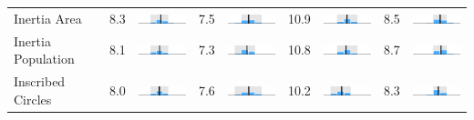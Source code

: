 \begin{table}
\begin{tabular}{l rm{7em} rm{7em} rm{7em} rm{7em}}
Inertia Area           &   8.3 &    \includegraphics[width=7em]{mini_hist/PA_2000_inertia_a} &   7.5 &    \includegraphics[width=7em]{mini_hist/PA_2004_inertia_a} &  10.9 &    \includegraphics[width=7em]{mini_hist/PA_2008_inertia_a} &   8.5 &    \includegraphics[width=7em]{mini_hist/PA_2012_inertia_a} \\
Inertia Population     &   8.1 &    \includegraphics[width=7em]{mini_hist/PA_2000_inertia_p} &   7.3 &    \includegraphics[width=7em]{mini_hist/PA_2004_inertia_p} &  10.8 &    \includegraphics[width=7em]{mini_hist/PA_2008_inertia_p} &   8.7 &    \includegraphics[width=7em]{mini_hist/PA_2012_inertia_p} \\
Inscribed Circles      &   8.0 &    \includegraphics[width=7em]{mini_hist/PA_2000_ehrenburg} &   7.6 &    \includegraphics[width=7em]{mini_hist/PA_2004_ehrenburg} &  10.2 &    \includegraphics[width=7em]{mini_hist/PA_2008_ehrenburg} &   8.3 &    \includegraphics[width=7em]{mini_hist/PA_2012_ehrenburg} \\

\end{tabular}
\end{table}
